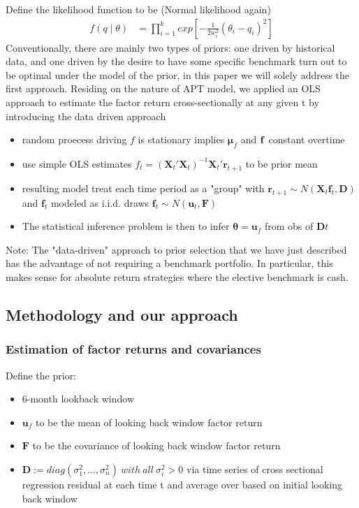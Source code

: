\documentclass[12pt]{article}
\numberwithin{equation}{section}
\begin{document}
Define the likelihood function to be (Normal likelihood again)
\begin{align} 
f(q \mid \theta) &= \prod_{i=1}^{k} exp[{-\frac{1}{2w_i^2}(\theta_i - q_i)^2}]
\end{align}
Conventionally, there are mainly two types of priors: one driven by historical data, and one driven by the desire to have some specific
benchmark turn out to be optimal under the model of the prior, in this paper we will solely address the first approach.
Residing on the nature of APT model, we applied an OLS approach to estimate the factor return cross-sectionally at any given t by 
introducing the data driven approach
  \begin{itemize}
    \setlength{\itemindent}{.25in}
    \item  random proecess driving $f$ is stationary implies $\boldsymbol{\mu}_f$ and ${\bf f}$ constant overtime
    \item  use simple OLS estimates  $f_t = (\textbf{X}_t ' \textbf{X}_t)^{-1} \textbf{X}_t' \textbf{r}_{t+1}$ to be prior mean
    \item  resulting model treat each time period as a "group" with $\textbf{r}_{t+1} \sim N(\textbf{X}_t \textbf{f}_t, \textbf{D})$ and $\textbf{f}_t$ modeled as i.i.d. draws $\textbf{f}_t \sim N(\textbf{u}_t, \textbf{F}) $
    \item  The statistical inference problem is then to infer $\boldsymbol{\theta} = \textbf{u}_f$ from obs of $\textbf{D}t$
  \end{itemize}
\setlength{\itemindent}{-.25in}
Note: The "data-driven" approach to prior selection that we have just described has the advantage of not requiring a benchmark portfolio. In particular, this makes sense for absolute return strategies where the elective benchmark is cash.
 
\subsection{Methodology and our approach}
\subsubsection{Estimation of factor returns and covariances}
Define the prior:
 \begin{itemize}
    \setlength{\itemindent}{.25in}
    \item  6-month lookback window
    \item  $\textbf{u}_f$ to be the mean of looking back window factor return
    \item  $\textbf{F}$ to be the covariance of looking back window factor return
    \item  $\textbf{D} := diag( \sigma_1^2,...,\sigma_n^2) \ with \  all \   \sigma_i^2 > 0$ via time series of cross sectional regression residual at each time t and average over based on initial looking back window
 \end{itemize}
\end{document}
